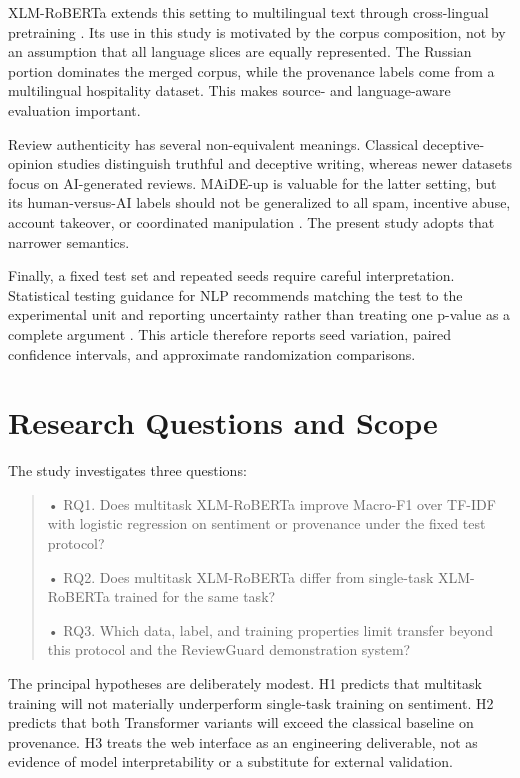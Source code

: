 \documentclass[11pt,a4paper]{article}
\begin{document}
XLM-RoBERTa extends this setting to multilingual text through
cross-lingual pretraining \citep{conneau2020xlmr}. Its use in this study is motivated by
the corpus composition, not by an assumption that all language slices
are equally represented. The Russian portion dominates the merged
corpus, while the provenance labels come from a multilingual hospitality
dataset. This makes source- and language-aware evaluation important.

Review authenticity has several non-equivalent meanings. Classical
deceptive-opinion studies distinguish truthful and deceptive writing,
whereas newer datasets focus on AI-generated reviews. MAiDE-up is
valuable for the latter setting, but its human-versus-AI labels should
not be generalized to all spam, incentive abuse, account takeover, or
coordinated manipulation \citep{ignat2025maide}. The present study adopts that narrower
semantics.

Finally, a fixed test set and repeated seeds require careful
interpretation. Statistical testing guidance for NLP recommends matching
the test to the experimental unit and reporting uncertainty rather than
treating one p-value as a complete argument \citep{dror2018hitchhiker}. This article
therefore reports seed variation, paired confidence intervals, and
approximate randomization comparisons.

\section{Research Questions and Scope}

The study investigates three questions:

\begin{quote}
• RQ1. Does multitask XLM-RoBERTa improve Macro-F1 over TF-IDF with
logistic regression on sentiment or provenance under the fixed test
protocol?

• RQ2. Does multitask XLM-RoBERTa differ from single-task XLM-RoBERTa
trained for the same task?

• RQ3. Which data, label, and training properties limit transfer beyond
this protocol and the ReviewGuard demonstration system?
\end{quote}

The principal hypotheses are deliberately modest. H1 predicts that
multitask training will not materially underperform single-task training
on sentiment. H2 predicts that both Transformer variants will exceed the
classical baseline on provenance. H3 treats the web interface as an
engineering deliverable, not as evidence of model interpretability or a
substitute for external validation.
\end{document}
